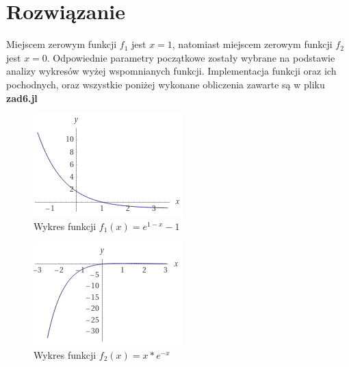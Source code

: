 \documentclass[a4paper,14pt]{report}
\begin{document}
  \section{Rozwiązanie}
    Miejscem zerowym funkcji $f_{1}$ jest $x=1$, natomiast miejscem zerowym funkcji $f_{2}$ jest $x=0$. Odpowiednie parametry początkowe zostały wybrane na podstawie analizy wykresów wyżej wspomnianych funkcji.
    Implementacja funkcji oraz ich pochodnych, oraz wszystkie poniżej wykonane obliczenia zawarte są w pliku \textbf{zad6.jl}
    \begin{figure}[H]
      \includegraphics[scale=1.0]{zad6a}
      \centering
      \caption{Wykres funkcji $f_{1}(x)=e^{1-x}-1$}
    \end{figure}
    \begin{figure}[H]
      \includegraphics[scale=1.0]{zad6b}
      \centering
      \caption{Wykres funkcji $f_{2}(x)=x*e^{-x}$}
    \end{figure}
\end{document}
